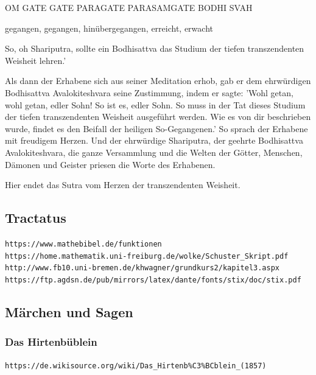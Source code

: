 \documentclass[10pt,a4paper]{article}
\begin{document}
\vskip 4pt
OM GATE GATE PARAGATE PARASAMGATE BODHI SVAH

\vskip 4pt
gegangen, gegangen, hinübergegangen, erreicht, erwacht

\vskip 4pt
So, oh Shariputra, sollte ein Bodhisattva das Studium der tiefen
transzendenten Weisheit lehren.'

\vskip 4pt
Als dann der Erhabene sich aus seiner Meditation erhob, gab er dem
ehrwürdigen Bodhisattva Avalokiteshvara seine Zustimmung, indem er sagte:
'Wohl getan, wohl getan, edler Sohn! So ist es, edler Sohn. So muss in der Tat
dieses Studium der tiefen transzendenten Weisheit ausgeführt werden. Wie es
von dir beschrieben wurde, findet es den Beifall der heiligen So-Gegangenen.'
So sprach der Erhabene mit freudigem Herzen. Und der ehrwürdige Shariputra,
der geehrte Bodhisattva Avalokiteshvara, die ganze Versammlung und die
Welten der Götter, Menschen, Dämonen und Geister priesen die Worte des
Erhabenen.

\vskip 4pt
Hier endet das Sutra vom Herzen der transzendenten Weisheit.


\newpage
\subsection{Tractatus}

\verb+https://www.mathebibel.de/funktionen+ \\
\verb+https://home.mathematik.uni-freiburg.de/wolke/Schuster_Skript.pdf+ \\
\verb+http://www.fb10.uni-bremen.de/khwagner/grundkurs2/kapitel3.aspx+ \\
\verb+https://ftp.agdsn.de/pub/mirrors/latex/dante/fonts/stix/doc/stix.pdf+


\newpage
\subsection{Märchen und Sagen}

\subsubsection{Das Hirtenbüblein}

\verb+https://de.wikisource.org/wiki/Das_Hirtenb%C3%BCblein_(1857)+
\end{document}
